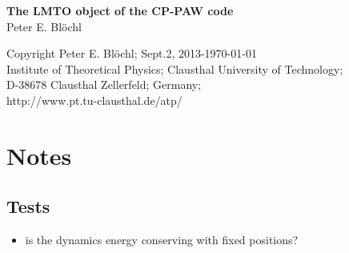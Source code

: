 \documentclass[11pt,a4paper]{report}
\begin{document}
\begin{titlepage}
\begin{center}
\vspace*{3.5cm}
{\huge \textbf{The LMTO object of the CP-PAW code}}\\
\vspace{0.5cm}
{\large Peter E. Bl\"ochl}
\vspace{0.5cm} 
\end{center}

\vfill
\begin{center}
Copyright Peter E. Bl\"ochl; Sept.2, 2013-\today\\
{\small
Institute of Theoretical Physics;
Clausthal University of Technology;\\ 
D-38678 Clausthal Zellerfeld; Germany;\\
http://www.pt.tu-clausthal.de/atp/}
\end{center}
\end{titlepage}
\noindent            
\tableofcontents
\chapter{Notes}

\section{Tests}
\begin{itemize}
\item is the dynamics energy conserving with fixed positions?
%
\end{itemize}

\end{document}
